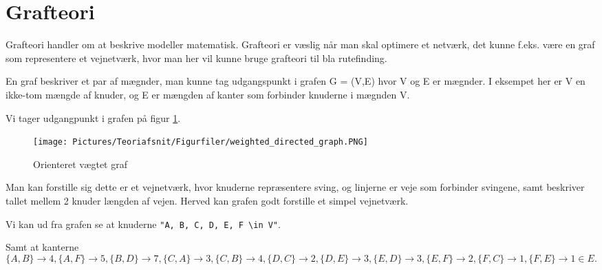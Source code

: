 \section{Grafteori}

Grafteori handler om at beskrive  modeller matematisk. Grafteori er væslig når man skal optimere et netværk, det kunne f.eks. være en graf som representere et vejnetværk, hvor man her vil kunne bruge grafteori til bla rutefinding.  

En graf beskriver et par af mægnder, man kunne tag udgangspunkt i grafen G = (V,E) hvor V og E er mægnder. I eksempet her er V en ikke-tom mængde af knuder, og E er mængden af kanter som forbinder knuderne i mægnden V. 

\vspace{5mm}

Vi tager udgangpunkt i grafen på figur \ref{fig:weighted-directed-graph}.

\begin{figure}[H]
\begin{adjustbox}{width=0.5\textwidth,center=\textwidth}
\centering
\texttt{[image: Pictures/Teoriafsnit/Figurfiler/weighted\_directed\_graph.PNG]}
\end{adjustbox}
\caption{Orienteret vægtet graf}
\label{fig:weighted-directed-graph}
\end{figure}

\vspace{5mm}

Man kan forstille sig dette er et vejnetværk, hvor knuderne repræsentere sving, og linjerne er veje som forbinder svingene, samt beskriver tallet mellem 2 knuder længden af vejen. Herved kan grafen godt forstille et simpel vejnetværk.

\vspace{5mm}

Vi kan ud fra grafen se at knuderne \verb!"A, B, C, D, E, F \in V"!. 

\vspace{5mm}

Samt at kanterne
\begin{equation}\label{grafteori}
\{A,B\} \rightarrow 4, \{A,F\} \rightarrow 5, \{B,D\} \rightarrow 7, \{C,A\} \rightarrow 3, \{C,B\} \rightarrow 4 , \{D,C\} \rightarrow 2, \{D,E\} \rightarrow 3 , \{E,D\} \rightarrow 3, \{E,F\} \rightarrow 2, \{F,C\} \rightarrow 1 , \{F,E\} \rightarrow 1 \in  E.
\end{equation}

\vspace{5mm}

